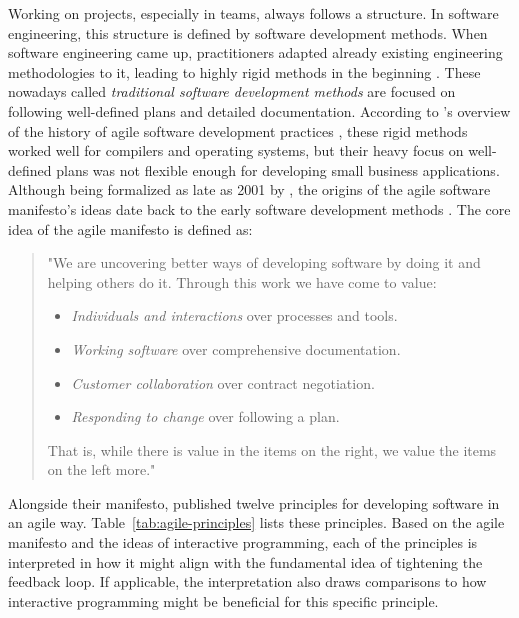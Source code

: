 Working on projects, especially in teams, always follows a structure.
In software engineering, this structure is defined by software development methods.
When software engineering came up, practitioners adapted already existing engineering methodologies to it, leading to highly rigid methods in the beginning \cite{misra_agile_2012}.
These nowadays called \emph{traditional software development methods} are focused on following well-defined plans and detailed documentation.
According to \citeauthor{misra_agile_2012}'s overview of the history of agile software development practices \cite{misra_agile_2012}, these rigid methods worked well for compilers and operating systems, but their heavy focus on well-defined plans was not flexible enough for developing small business applications.
Although being formalized as late as 2001 by \citeauthor{beck_manifesto_2001}, the origins of the agile software manifesto's ideas \cite{beck_manifesto_2001} date back to the early software development methods \cite{van_der_aalst_historical_2008}.
The core idea of the agile manifesto is defined as:
%
\begin{quote}
    "We are uncovering better ways of developing software by doing it and helping others do it.
    Through this work we have come to value:
    \begin{itemize}
        \item \emph{Individuals and interactions} over processes and tools.
        \item \emph{Working software} over comprehensive documentation.
        \item \emph{Customer collaboration} over contract negotiation.
        \item \emph{Responding to change} over following a plan.
    \end{itemize}
    That is, while there is value in the items on the right, we value the items on the left more." \cite{beck_manifesto_2001}
\end{quote}
%

Alongside their manifesto, \citeauthor{beck_manifesto_2001} published twelve principles for developing software in an agile way.
Table~\ref{tab:agile-principles} lists these principles.
Based on the agile manifesto and the ideas of interactive programming, each of the principles is interpreted in how it might align with the fundamental idea of tightening the feedback loop.
If applicable, the interpretation also draws comparisons to how interactive programming might be beneficial for this specific principle.

